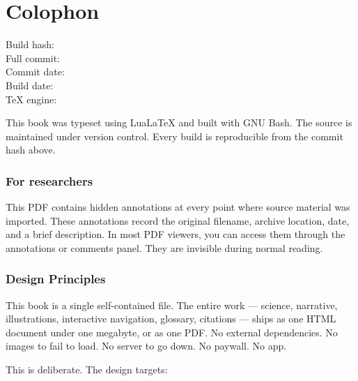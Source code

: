 
\chapter*{Colophon}

\vspace{1cm}

\begin{description}
\item[Build hash:] \texttt{\GitShortHash}
\item[Full commit:] \texttt{\GitHash}
\item[Commit date:] \GitDate
\item[Build date:] \BuildDate
\item[TeX engine:] 
\end{description}

\vspace{1cm}

This book was typeset using Lua\LaTeX{} and built with GNU Bash. The source is maintained under version control. Every build is reproducible from the commit hash above.

\subsection*{For researchers}

This PDF contains hidden annotations at every point where source material was imported. These annotations record the original filename, archive location, date, and a brief description. In most PDF viewers, you can access them through the annotations or comments panel. They are invisible during normal reading.

\subsection*{Design Principles}

This book is a single self-contained file. The entire work --- science,
narrative, illustrations, interactive navigation, glossary, citations ---
ships as one HTML document under one megabyte, or as one PDF. No external
dependencies. No images to fail to load. No server to go down. No paywall.
No app.

This is deliberate. The design targets:

